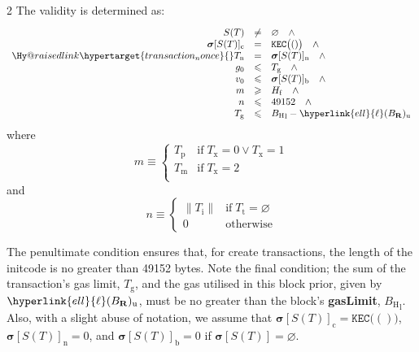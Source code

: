 \documentclass[9pt,oneside]{amsart}
\makeatletter
\newcommand{\linkdest}[1]{\Hy@raisedlink{\hypertarget{#1}{}}}
\makeatother
\begin{document}
\begin{multicols}{2}
The validity is determined as:
\begin{equation}
\begin{array}[t]{rcl}
S(T) & \neq & \varnothing \quad \wedge \\
\boldsymbol{\sigma}[S(T)]_{\mathrm{c}} & = & \texttt{KEC}\big( () \big) \quad \wedge \\
\linkdest{transaction_nonce}{}T_{\mathrm{n}} & = & \boldsymbol{\sigma}[S(T)]_{\mathrm{n}} \quad \wedge \\
g_0 & \leqslant & T_{\mathrm{g}} \quad \wedge \\
v_0 & \leqslant & \boldsymbol{\sigma}[S(T)]_{\mathrm{b}} \quad \wedge \\
m & \geqslant & H_{\mathrm{f}} \quad \wedge \\
n & \leqslant & 49152 \quad \wedge \\
T_{\mathrm{g}} & \leqslant & {B_{\mathrm{H}}}_{\mathrm{l}} - \hyperlink{ell}{\ell}(B_{\mathbf{R}})_{\mathrm{u}}
\end{array}
\end{equation}
where
\begin{equation}
  m \equiv \begin{cases}
  T_{\mathrm{p}} & \text{if} \; T_{\mathrm{x}} = 0 \lor T_{\mathrm{x}} = 1 \\
  T_{\mathrm{m}} & \text{if} \; T_{\mathrm{x}} = 2 \\
  \end{cases}
\end{equation}
and
\begin{equation}
  n \equiv \begin{cases}
    \lVert T_{\mathrm{i}} \rVert & \text{if} \; T_{\mathrm{t}} = \varnothing \\
    0 & \text{otherwise}
  \end{cases}
\end{equation}

The penultimate condition ensures that, for create transactions, the length of the initcode is no greater than 49152 bytes.
Note the final condition; the sum of the transaction's gas limit, $T_{\mathrm{g}}$, and the gas utilised in this block prior, given by $\hyperlink{ell}{\ell}(B_{\mathbf{R}})_{\mathrm{u}}$, must be no greater than the block's \textbf{gasLimit}, ${B_{\mathrm{H}}}_{\mathrm{l}}$.
Also, with a slight abuse of notation, we assume that $\boldsymbol{\sigma}[S(T)]_{\mathrm{c}} = \texttt{KEC}\big( () \big)$, $\boldsymbol{\sigma}[S(T)]_{\mathrm{n}} = 0$, and $\boldsymbol{\sigma}[S(T)]_{\mathrm{b}} = 0$ if $\boldsymbol{\sigma}[S(T)] = \varnothing$.


\end{multicols}
\end{document}
